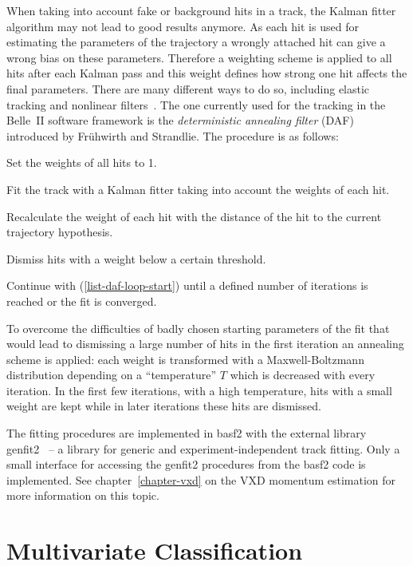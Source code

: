 When taking into account fake or background hits in a track, the Kalman fitter algorithm may not lead to good results anymore. As each hit is used for estimating the parameters of the trajectory a wrongly attached hit can give a wrong bias on these parameters. Therefore a weighting scheme is applied to all hits after each Kalman pass and this weight defines how strong one hit affects the final parameters. There are many different ways to do so, including elastic tracking and nonlinear filters~\cite{daf_fruh}. The one currently used for the tracking in the Belle~II software framework is the \emph{deterministic annealing filter} (DAF) introduced by Frühwirth and Strandlie. The procedure is as follows:
\begin{zlist}
  \item Set the weights of all hits to 1.
  \item Fit the track with a Kalman fitter taking into account the weights of each hit. \label{list-daf-loop-start}
  \item Recalculate the weight of each hit with the distance of the hit to the current trajectory hypothesis.
  \item Dismiss hits with a weight below a certain threshold.
  \item Continue with (\ref{list-daf-loop-start}) until a defined number of iterations is reached or the fit is converged.
\end{zlist}

To overcome the difficulties of badly chosen starting parameters of the fit that would lead to dismissing a large number of hits in the first iteration an annealing scheme is applied: each weight is transformed with a Maxwell-Boltzmann distribution depending on a ``temperature'' $T$ which is decreased with every iteration. In the first few iterations, with a high temperature, hits with a small weight are kept while in later iterations these hits are dismissed.

The fitting procedures are implemented in basf2 with the external library genfit2~\cite{genfit} -- a library for generic and experiment-independent track fitting. Only a small interface for accessing the genfit2 procedures from the basf2 code is implemented. See chapter~\ref{chapter-vxd} on the VXD momentum estimation for more information on this topic.

\section{Multivariate Classification}

